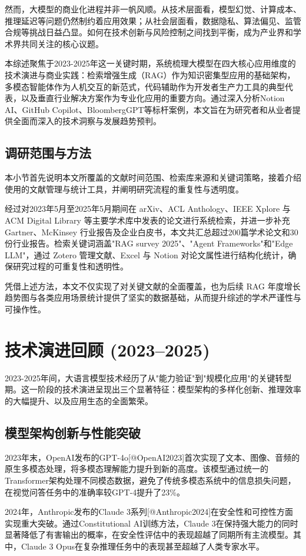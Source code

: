 \documentclass{article}
\begin{document}
然而，大模型的商业化进程并非一帆风顺。从技术层面看，模型幻觉、计算成本、推理延迟等问题仍然制约着应用效果；从社会层面看，数据隐私、算法偏见、监管合规等挑战日益凸显。如何在技术创新与风险控制之间找到平衡，成为产业界和学术界共同关注的核心议题。

本综述聚焦于2023-2025年这一关键时期，系统梳理大模型在四大核心应用维度的技术演进与商业实践：检索增强生成（RAG）作为知识密集型应用的基础架构，多模态智能体作为人机交互的新范式，代码辅助作为开发者生产力工具的典型代表，以及垂直行业解决方案作为专业化应用的重要方向。通过深入分析Notion AI、GitHub Copilot、BloombergGPT等标杆案例，本文旨在为研究者和从业者提供全面而深入的技术洞察与发展趋势预判。

\subsection{调研范围与方法}
本小节首先说明本文所覆盖的文献时间范围、检索库来源和关键词策略，接着介绍使用的文献管理与统计工具，并阐明研究流程的重复性与透明度。

经过对2023年5月至2025年5月期间在 arXiv、ACL Anthology、IEEE Xplore 与 ACM Digital Library 等主要学术库中发表的论文进行系统检索，并进一步补充 Gartner、McKinsey 行业报告及企业白皮书，本文共汇总超过200篇学术论文和30份行业报告。检索关键词涵盖"RAG survey 2025"、"Agent Frameworks"和"Edge LLM"，通过 Zotero 管理文献、Excel 与 Notion 对论文属性进行结构化统计，确保研究过程的可重复性和透明性。

凭借上述方法，本文不仅实现了对关键文献的全面覆盖，也为后续 RAG 年度增长趋势图与各类应用场景统计提供了坚实的数据基础，从而提升综述的学术严谨性与可操作性。

\section{技术演进回顾 (2023–2025)}
2023-2025年间，大语言模型技术经历了从"能力验证"到"规模化应用"的关键转型期。这一阶段的技术演进呈现出三个显著特征：模型架构的多样化创新、推理效率的大幅提升、以及应用生态的全面繁荣。

\subsection{模型架构创新与性能突破}
2023年末，OpenAI发布的GPT-4o[@OpenAI2023]首次实现了文本、图像、音频的原生多模态处理，将多模态理解能力提升到新的高度。该模型通过统一的Transformer架构处理不同模态数据，避免了传统多模态系统中的信息损失问题，在视觉问答任务中的准确率较GPT-4提升了23\%。

2024年，Anthropic发布的Claude 3系列[@Anthropic2024]在安全性和可控性方面实现重大突破。通过Constitutional AI训练方法，Claude 3在保持强大能力的同时显著降低了有害输出的概率，在安全性评估中的表现超越了同期所有主流模型。其中，Claude 3 Opus在复杂推理任务中的表现甚至超越了人类专家水平。
\end{document}
